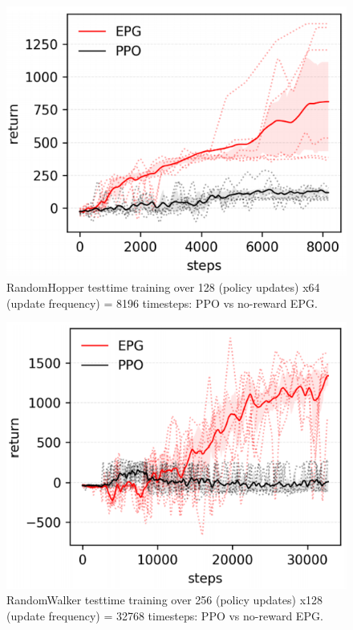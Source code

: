 \begin{figure}[H]
	\includegraphics[scale=0.6]{hopper.png}
	\centering
	\caption{RandomHopper testtime training over 128 (policy updates) x64 (update frequency) = 8196 timesteps: PPO vs no-reward EPG.}
	\label{hopper}
\end{figure}
\begin{figure}[H]
	\includegraphics[scale=0.6]{walker.png}
	\centering
	\caption{RandomWalker testtime training over 256 (policy updates) x128 (update frequency) = 32768 timesteps: PPO vs no-reward EPG.}
	\label{walker}
\end{figure}
